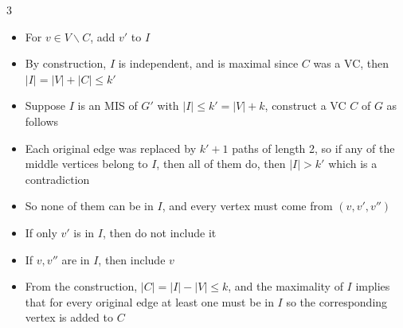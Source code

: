 \documentclass[10pt, landscape]{article}
\begin{document}
\begin{multicols*}{3}
\begin{itemize}
    \item For $v \in V \backslash C$, add $v'$ to $I$
    \item By construction, $I$ is independent, and is maximal since $C$ was a VC, then $|I|=|V|+|C| \leq k'$
    \item Suppose $I$ is an MIS of $G'$ with $|I| \leq k'=|V|+k$, construct a VC $C$ of $G$ as follows
    \item Each original edge was replaced by $k'+1$ paths of length 2, so if any of the middle vertices belong to $I$, then all of them do, then $|I| > k'$ which is a contradiction
    \item So none of them can be in $I$, and every vertex must come from $(v,v',v'')$
    \item If only $v'$ is in $I$, then do not include it
    \item If $v,v''$ are in $I$, then include $v$
    \item From the construction, $|C|=|I|-|V| \leq k$, and the maximality of $I$ implies that for every original edge at least one must be in $I$ so the corresponding vertex is added to $C$
\end{itemize}


\end{multicols*}
\end{document}
